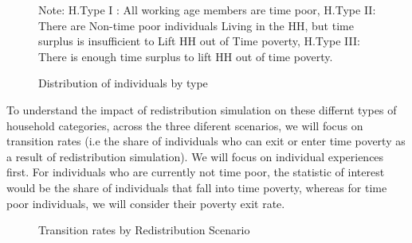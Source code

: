 \documentclass[
  11pt,
]{article}
\begin{document}
\begin{figure}[H]
{\begin{figure}[H]
\begin{minipage}{0.50\linewidth}
{}


\end{minipage}%

\end{figure}%

\footnotesize

\begin{flushleft}Note: H.Type I : All working age members are time poor, H.Type II: There are Non-time poor individuals Living in the HH, but time surplus is insufficient to Lift HH out of Time poverty, H.Type III: There is enough time surplus to lift HH out of time poverty.\end{flushleft}

}

\caption{\label{fig-dist}Distribution of individuals by type}

\end{figure}%

To understand the impact of redistribution simulation on these differnt
types of household categories, across the three diferent scenarios, we
will focus on transition rates (i.e the share of individuals who can
exit or enter time poverty as a result of redistribution simulation). We
will focus on individual experiences first. For individuals who are
currently not time poor, the statistic of interest would be the share of
individuals that fall into time poverty, whereas for time poor
individuals, we will consider their poverty exit rate.

\begin{figure}[H]


\caption{\label{fig-transition1}Transition rates by Redistribution
Scenario}

\end{figure}%
\end{document}
